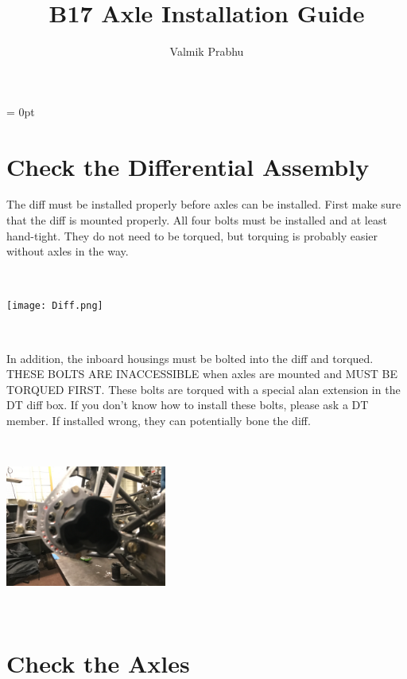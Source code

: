 \documentclass{article}
\title{B17 Axle Installation Guide}
\author{Valmik Prabhu}
\begin{document}
\parindent = 0pt

\maketitle

\section{Check the Differential Assembly}
The diff must be installed properly before axles can be installed. First make sure that the diff is mounted properly. All four bolts must be installed and at least hand-tight. They do not need to be torqued, but torquing is probably easier without axles in the way.

\begin{minipage}{\linewidth}
$\,$

\begin{center}
\texttt{[image: Diff.png]}

\end{center}
$\,$
\end{minipage}

In addition, the inboard housings must be bolted into the diff and torqued. THESE BOLTS ARE INACCESSIBLE when axles are mounted and MUST BE TORQUED FIRST. These bolts are torqued with a special alan extension in the DT diff box. If you don't know how to install these bolts, please ask a DT member. If installed wrong, they can potentially bone the diff.

\begin{minipage}{\linewidth}
$\,$

\begin{center}
\includegraphics[width = 150pt]{InboardHousing.png}

\end{center}
$\,$
\end{minipage}


\section{Check the Axles}
\end{document}
